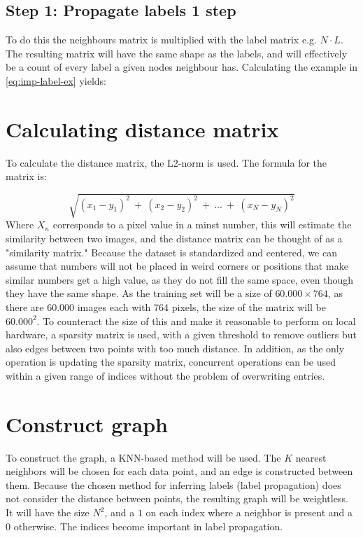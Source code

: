 \subsection{Step 1: Propagate labels 1 step}
To do this the neighbours matrix is multiplied with the label matrix e.g. $N\cdot L$. The resulting matrix will have the same shape as the labels, and will effectively be a count of every label a given nodes neighbour has. Calculating the example in \cref{eq:imp-label-ex} yields:

\section{Calculating distance matrix}
To calculate the distance matrix, the L2-norm is used. The formula for the matrix is:

$$
    \sqrt{{(x_1-y_1)}^2\ +\ {(x_2-y_2)}^2\ +\ ...\ +\ {(x_N-y_N)}^2} 
$$
Where $X_n$ corresponds to a pixel value in a minst number, this will estimate the similarity between two images, and the distance matrix can be thought of as a "similarity matrix." Because the dataset is standardized and centered, we can assume that numbers will not be placed in weird corners or positions that make similar numbers get a high value, as they do not fill the same space, even though they have the same shape. As the training set will be a size of $60.000 \times 764$, as there are 60.000 images each with 764 pixels, the size of the matrix will be $60.000^2$. To counteract the size of this and make it reasonable to perform on local hardware, a sparsity matrix is used, with a given threshold to remove outliers but also edges between two points with too much distance. In addition, as the only operation is updating the sparsity matrix, concurrent operations can be used within a given range of indices without the problem of overwriting entries.

\section{Construct graph}
To construct the graph, a KNN-based method will be used. The $K$ nearest neighbors will be chosen for each data point, and an edge is constructed between them. Because the chosen method for inferring labels (label propagation) does not consider the distance between points, the resulting graph will be weightless. It will have the size $N^2$, and a $1$ on each index where a neighbor is present and a $0$ otherwise. The indices become important in label propagation.


